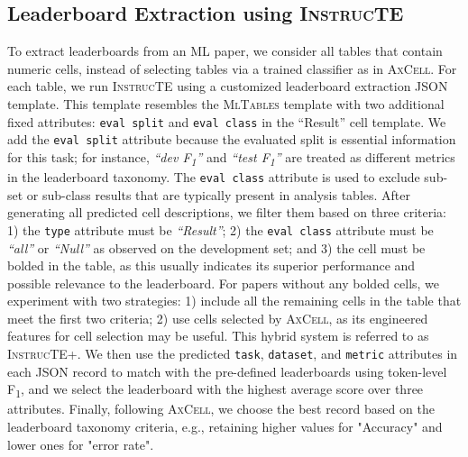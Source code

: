 \documentclass[11pt]{article}
\newcommand\method{\textsc{InstrucTE}}
\newcommand\data{\textsc{MlTables}}
\newcommand\axcell{\textsc{AxCell}}
\begin{document}
\subsection{Leaderboard Extraction using \method{}}
To extract leaderboards from an ML paper, we consider all tables that contain numeric cells, instead of selecting tables via a trained classifier as in \axcell{}. For each table, we run \method{} using a customized leaderboard extraction JSON template. This template resembles the \data{} template with two additional fixed attributes: \texttt{eval split} and \texttt{eval class} in the ``Result'' cell template. We add the \texttt{eval split} attribute because the evaluated split is essential information for this task; for instance, \textit{``dev F\textsubscript{1}''} and \textit{``test F\textsubscript{1}''} are treated as different metrics in the leaderboard taxonomy. 
The \texttt{eval class} attribute is used to exclude sub-set or sub-class results that are typically present in analysis tables. After generating all predicted cell descriptions, we filter them based on three criteria: 1) the \texttt{type} attribute must be \textit{``Result''}; 2) the \texttt{eval class} attribute must be \textit{``all''} or \textit{``Null''} as observed on the development set; and 3) the cell must be bolded in the table, as this usually indicates its superior performance and possible relevance to the leaderboard. 
For papers without any bolded cells, we experiment with two strategies: 1) include all the remaining cells in the table that meet the first two criteria; 2) use cells selected by \axcell{}, as its engineered features for cell selection may be useful. This hybrid system is referred to as \method{}+.
We then use the predicted \texttt{task}, \texttt{dataset}, and \texttt{metric} attributes in each JSON record to match with the pre-defined leaderboards using token-level F\textsubscript{1}, and we select the leaderboard with the highest average score over three attributes. Finally, following \axcell{}, we choose the best record based on the leaderboard taxonomy criteria, e.g., retaining higher values for "Accuracy" and lower ones for "error rate".
\end{document}
